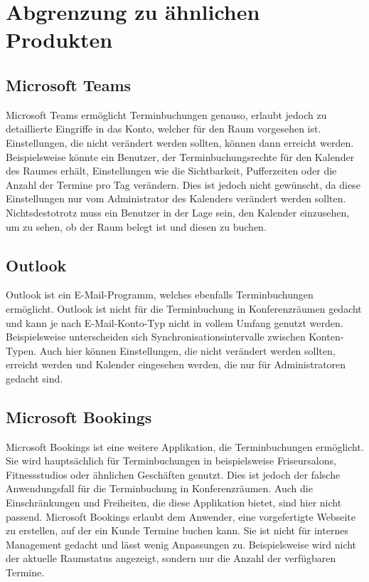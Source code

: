 
\section{Abgrenzung zu ähnlichen Produkten}\label{sec:abgrenzung-zu-ahnlichen-produkten}

\subsection{Microsoft Teams}\label{subsec:microsoft-teams}
Microsoft Teams ermöglicht Terminbuchungen genauso, erlaubt jedoch zu detaillierte Eingriffe in das Konto, welcher für den Raum vorgesehen ist.
Einstellungen, die nicht verändert werden sollten, können dann erreicht werden.
Beispielsweise könnte ein Benutzer, der Terminbuchungsrechte für den Kalender des Raumes erhält, Einstellungen wie die Sichtbarkeit, Pufferzeiten oder die Anzahl der Termine pro Tag verändern.
Dies ist jedoch nicht gewünscht, da diese Einstellungen nur vom Administrator des Kalenders verändert werden sollten.
Nichtsdestotrotz muss ein Benutzer in der Lage sein, den Kalender einzusehen, um zu sehen, ob der Raum belegt ist und diesen zu buchen.
\newline
\subsection{Outlook}\label{subsec:outlook}
Outlook ist ein E-Mail-Programm, welches ebenfalls Terminbuchungen ermöglicht.
Outlook ist nicht für die Terminbuchung in Konferenzräumen gedacht und kann je nach E-Mail-Konto-Typ nicht in vollem Umfang genutzt werden.
Beispielsweise unterscheiden sich Synchronisationsintervalle zwischen Konten-Typen.
Auch hier können Einstellungen, die nicht verändert werden sollten, erreicht werden und Kalender eingesehen werden, die nur für Administratoren gedacht sind.
\newline
\subsection{Microsoft Bookings}\label{subsec:microsoft-bookings}
Microsoft Bookings ist eine weitere Applikation, die Terminbuchungen ermöglicht.
Sie wird hauptsächlich für Terminbuchungen in beispielsweise Friseursalons, Fitnessstudios oder ähnlichen Geschäften genutzt.
Dies ist jedoch der falsche Anwendungsfall für die Terminbuchung in Konferenzräumen.
Auch die Einschränkungen und Freiheiten, die diese Applikation bietet, sind hier nicht passend.
Microsoft Bookings erlaubt dem Anwender, eine vorgefertigte Webseite zu erstellen, auf der ein Kunde Termine buchen kann.
Sie ist nicht für internes Management gedacht und lässt wenig Anpassungen zu.
Beispielsweise wird nicht der aktuelle Raumstatus angezeigt, sondern nur die Anzahl der verfügbaren Termine.
\newline
